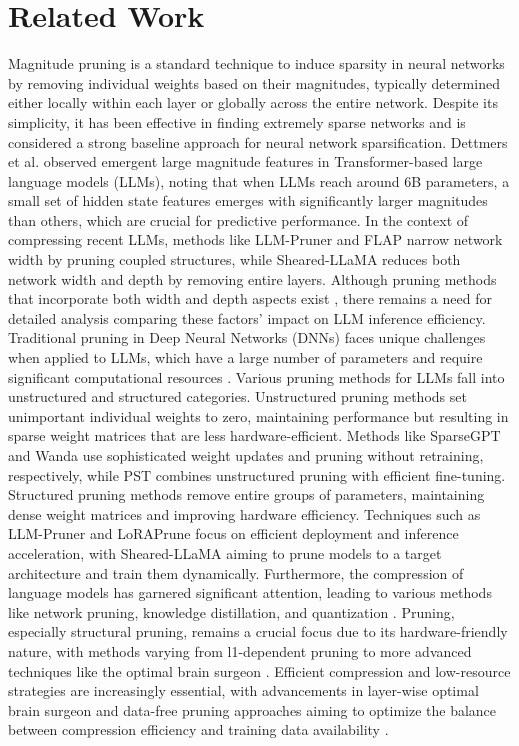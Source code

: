 \section{Related Work}
\label{sec:relWorks}
Magnitude pruning \citep{han2015learning} is a standard technique to induce sparsity in neural networks by removing individual weights based on their magnitudes, typically determined either locally within each layer or globally across the entire network. Despite its simplicity, it has been effective in finding extremely sparse networks \citep{Frankle2019} and is considered a strong baseline approach \citep{Blalock2020} for neural network sparsification. Dettmers et al. \citep{dettmers2022gpt3} observed emergent large magnitude features in Transformer-based large language models (LLMs), noting that when LLMs reach around 6B parameters, a small set of hidden state features emerges with significantly larger magnitudes than others, which are crucial for predictive performance. In the context of compressing recent LLMs, methods like LLM-Pruner \citep{ma2023llm} and FLAP \citep{an2024fluctuation} narrow network width by pruning coupled structures, while Sheared-LLaMA \citep{xia2023sheared} reduces both network width and depth by removing entire layers. Although pruning methods that incorporate both width and depth aspects exist \citep{xia2022structured, kurtic2024ziplm}, there remains a need for detailed analysis comparing these factors' impact on LLM inference efficiency. Traditional pruning in Deep Neural Networks (DNNs) faces unique challenges when applied to LLMs, which have a large number of parameters and require significant computational resources \citep{brown2020language}. Various pruning methods for LLMs fall into unstructured and structured categories. Unstructured pruning methods \citep{dong2017learning, chen2020tight, chen2021knowledge} set unimportant individual weights to zero, maintaining performance but resulting in sparse weight matrices that are less hardware-efficient. Methods like SparseGPT \citep{frantar2023sparsegpt} and Wanda \citep{sun2023simple} use sophisticated weight updates and pruning without retraining, respectively, while PST \citep{li2022parameter} combines unstructured pruning with efficient fine-tuning. Structured pruning methods \citep{chen2021only, chen2023otov2} remove entire groups of parameters, maintaining dense weight matrices and improving hardware efficiency. Techniques such as LLM-Pruner \citep{ma2023llm} and LoRAPrune \citep{zhang2023loraprune} focus on efficient deployment and inference acceleration, with Sheared-LLaMA \citep{xia2023sheared} aiming to prune models to a target architecture and train them dynamically. Furthermore, the compression of language models has garnered significant attention, leading to various methods like network pruning, knowledge distillation, and quantization \citep{bai2020binarybert, brown2020language, devlin2018bert}. Pruning, especially structural pruning, remains a crucial focus due to its hardware-friendly nature, with methods varying from l1-dependent pruning \citep{zafrir2021prune} to more advanced techniques like the optimal brain surgeon \citep{LeCun}. Efficient compression and low-resource strategies are increasingly essential, with advancements in layer-wise optimal brain surgeon and data-free pruning approaches aiming to optimize the balance between compression efficiency and training data availability \citep{kurtic2024ziplm, srinivas2015data}.